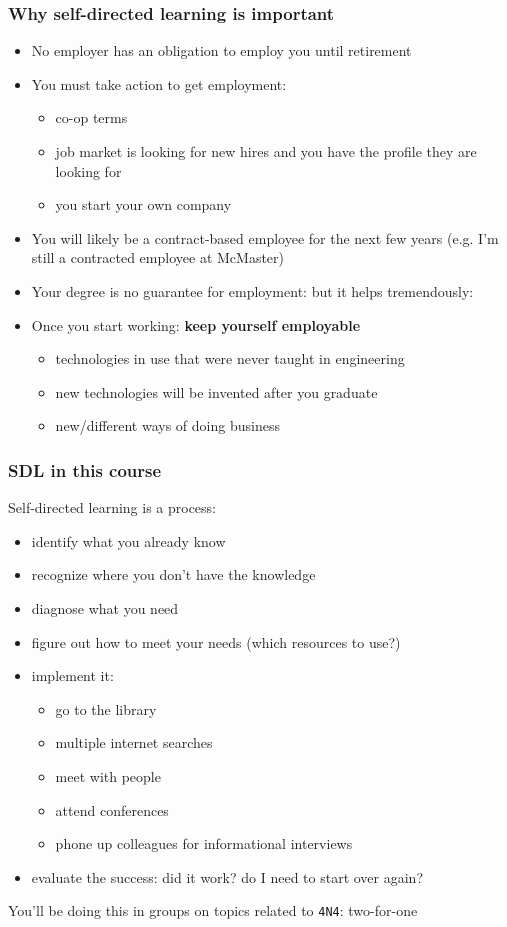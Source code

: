 \begin{frame}\frametitle{Why self-directed learning is important}
	\begin{itemize}
		\item	No employer has an obligation to employ you until retirement
		\item	You must take action to get employment:
		\begin{itemize}
			\item	co-op terms
			\item	job market is looking for new hires and you have the profile they are looking for
			\item	you start your own company
		\end{itemize}
		\pause
		\item	You will likely be a contract-based employee for the next few years (e.g. I'm still a contracted employee at McMaster)
		\item	Your degree is no guarantee for employment: but it helps tremendously: {}
		\pause
		\item	Once you start working: \textbf{keep yourself employable}
		\begin{itemize}
			\item	technologies in use that were never taught in engineering
			\item	new technologies will be invented after you graduate
			\item	new/different ways of doing business			
		\end{itemize}
	\end{itemize}
\end{frame}

\begin{frame}\frametitle{SDL in this course}
	Self-directed learning is a process: 
	\begin{itemize}
		\item	identify what you already know
		\item	recognize where you don't have the knowledge
		\item	diagnose what you need
		\item	figure out how to meet your needs (which resources to use?)
		\item	implement it: 
		\begin{itemize}
			\item	go to the library
			\item	multiple internet searches
			\item	meet with people
			\item	attend conferences
			\item	phone up colleagues for informational interviews
		\end{itemize}
		\item	evaluate the success: did it work? do I need to start over again?
	\end{itemize}
	\vspace{12pt}
	You'll be doing this in groups on topics related to \texttt{4N4}: two-for-one
\end{frame}

